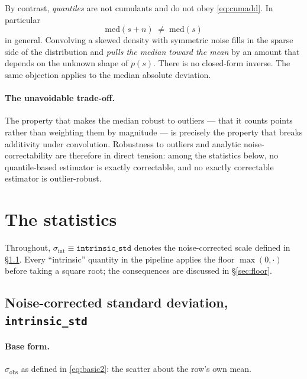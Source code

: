 \documentclass[11pt]{article}
\newcommand{\istd}{\texttt{intrinsic\_std}}
\newcommand{\sigobs}{\sigma_{\mathrm{obs}}}
\newcommand{\sigint}{\sigma_{\mathrm{int}}}
\begin{document}
By contrast, \emph{quantiles} are not cumulants and do not obey
\eqref{eq:cumadd}. In particular
%
\begin{equation}
  \mathrm{med}(s+n) \;\neq\; \mathrm{med}(s)
  \label{eq:medshift}
\end{equation}
%
in general. Convolving a skewed density with symmetric noise fills in the sparse
side of the distribution and \emph{pulls the median toward the mean} by an amount
that depends on the unknown shape of $p(s)$. There is no closed-form inverse.
The same objection applies to the median absolute deviation.

\paragraph{The unavoidable trade-off.} The property that makes the median robust
to outliers --- that it counts points rather than weighting them by magnitude ---
is precisely the property that breaks additivity under convolution. Robustness to
outliers and analytic noise-correctability are therefore in direct tension: among
the statistics below, no quantile-based estimator is exactly correctable, and no
exactly correctable estimator is outlier-robust.

\section{The statistics}

Throughout, $\sigint \equiv \istd$ denotes the noise-corrected scale defined in
\S\ref{sec:std}. Every ``intrinsic'' quantity in the pipeline applies the floor
$\max(0,\cdot)$ before taking a square root; the consequences are discussed in
\S\ref{sec:floor}.

\subsection{Noise-corrected standard deviation, \istd}
\label{sec:std}

\paragraph{Base form.} $\sigobs$ as defined in \eqref{eq:basic2}: the scatter
about the row's own mean.
\end{document}
